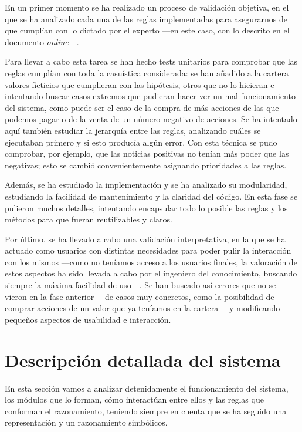 \documentclass[a4paper, 11pt, titlepage]{article}
\begin{document}
    En un primer momento se ha realizado un proceso de validación objetiva, en el que se ha analizado cada una de las reglas implementadas para asegurarnos de que cumplían con lo dictado por el experto ---en este caso, con lo descrito en el documento \emph{online}---.

    Para llevar a cabo esta tarea se han hecho tests unitarios para comprobar que las reglas cumplían con toda la casuística considerada: se han añadido a la cartera valores ficticios que cumplieran con las hipótesis, otros que no lo hicieran e intentando buscar casos extremos que pudieran hacer ver un mal funcionamiento del sistema, como puede ser el caso de la compra de más acciones de las que podemos pagar o de la venta de un número negativo de acciones. Se ha intentado aquí también estudiar la jerarquía entre las reglas, analizando cuáles se ejecutaban primero y si esto producía algún error. Con esta técnica se pudo comprobar, por ejemplo, que las noticias positivas no tenían más poder que las negativas; esto se cambió convenientemente asignando prioridades a las reglas.

    Además, se ha estudiado la implementación y se ha analizado su modularidad, estudiando la facilidad de mantenimiento y la claridad del código. En esta fase se pulieron muchos detalles, intentando encapsular todo lo posible las reglas y los métodos para que fueran reutilizables y claros.

    Por último, se ha llevado a cabo una validación interpretativa, en la que se ha actuado como usuarios con distintas necesidades para poder pulir la interacción con los mismos ---como no teníamos acceso a los usuarios finales, la valoración de estos aspectos ha sido llevada a cabo por el ingeniero del conocimiento, buscando siempre la máxima facilidad de uso---. Se han buscado así errores que no se vieron en la fase anterior ---de casos muy concretos, como la posibilidad de comprar acciones de un valor que ya teníamos en la cartera--- y modificando pequeños aspectos de usabilidad e interacción.

    \section{Descripción detallada del sistema}

    En esta sección vamos a analizar detenidamente el funcionamiento del sistema, los módulos que lo forman, cómo interactúan entre ellos y las reglas que conforman el razonamiento, teniendo siempre en cuenta que se ha seguido una representación y un razonamiento simbólicos.
\end{document}
